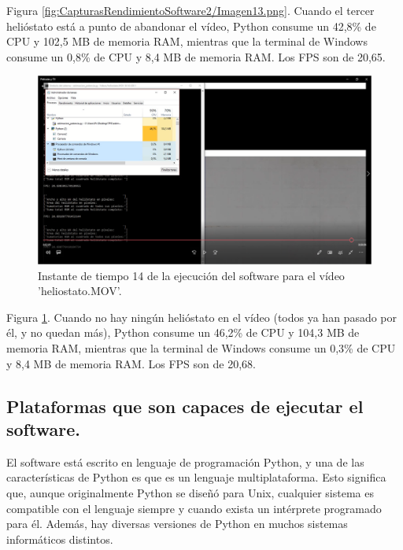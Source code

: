 Figura \ref{fig:CapturasRendimientoSoftware2/Imagen13.png}. Cuando el tercer helióstato está a punto de abandonar el vídeo, Python consume un 42,8\% de CPU y 102,5 MB de memoria RAM, mientras que la terminal de Windows consume un 0,8\% de CPU y 8,4 MB de memoria RAM. Los FPS son de 20,65.\\[20pt]

\begin{figure}[h!]
  	\centering
	\includegraphics[width=\textwidth]{CapturasRendimientoSoftware2/Imagen14.png}
	\caption{Instante de tiempo 14 de la ejecución del software para el vídeo 'heliostato.MOV'.
	\label{fig:CapturasRendimientoSoftware2/Imagen14.png}}
\end{figure}

Figura \ref{fig:CapturasRendimientoSoftware2/Imagen14.png}. Cuando no hay ningún helióstato en el vídeo (todos ya han pasado por él, y no quedan más), Python consume un 46,2\% de CPU y 104,3 MB de memoria RAM, mientras que la terminal de Windows consume un 0,3\% de CPU y 8,4 MB de memoria RAM. Los FPS son de 20,68.\\[20pt]

\subsection{Plataformas que son capaces de ejecutar el software.}

El software está escrito en lenguaje de programación Python, y una de las características de Python es que es un lenguaje multiplataforma. Esto significa que, aunque originalmente Python se diseñó para Unix, cualquier sistema es compatible con el lenguaje siempre y cuando exista un intérprete programado para él. Además, hay diversas versiones de Python en muchos sistemas informáticos distintos.


